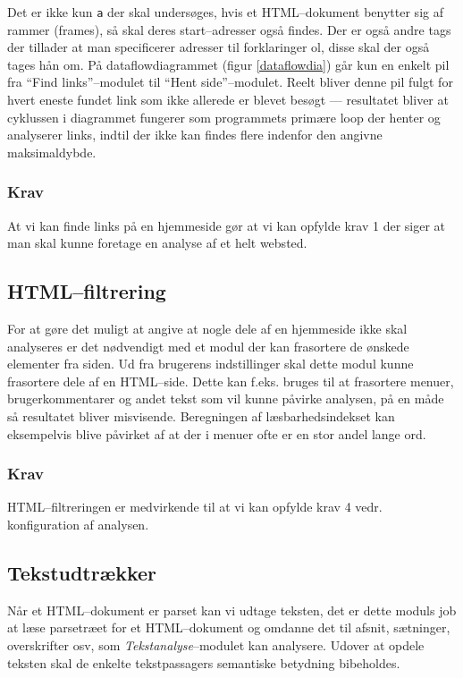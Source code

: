 \documentclass[a4paper,oneside]{memoir}
\begin{document}
Det er ikke kun \texttt{a} der skal undersøges, hvis et HTML--dokument
benytter sig af rammer (frames), så skal deres start--adresser også
findes. Der er også andre tags der tillader at man specificerer
adresser til forklaringer ol, disse skal der også tages hån om.
\label{cyklus}
  På dataflowdiagrammet (figur \ref{dataflowdia}) går kun en enkelt pil fra
``Find links''--modulet til ``Hent side''--modulet. Reelt bliver denne pil fulgt
for hvert eneste
fundet link som ikke allerede er blevet besøgt --- resultatet bliver at
cyklussen i diagrammet fungerer som programmets primære loop der
henter og analyserer links, indtil der ikke kan findes flere indenfor
den angivne maksimaldybde.

\subsubsection{Krav}
At vi kan finde links på en hjemmeside gør at vi kan opfylde krav 1
der siger at man skal kunne foretage en analyse af et helt websted.

\subsection{HTML--filtrering}
For at gøre det muligt at angive at nogle dele af en hjemmeside ikke
skal analyseres er det nødvendigt med et modul der kan frasortere de
ønskede elementer fra siden. Ud fra brugerens indstillinger skal dette
modul kunne frasortere dele af en HTML--side. Dette kan f.eks. bruges
til at frasortere menuer, brugerkommentarer og andet tekst som vil
kunne påvirke analysen, på en måde så resultatet bliver
misvisende. Beregningen af læsbarhedsindekset kan eksempelvis blive
påvirket af at der i menuer ofte er en stor andel lange ord.

\subsubsection{Krav}
HTML--filtreringen er medvirkende til at vi kan opfylde krav 4
vedr. konfiguration af analysen.

\subsection{Tekstudtrækker}
\label{tekstudtraekkerdesign}
Når et HTML--dokument er parset kan vi udtage teksten, det er dette
moduls job at læse parsetræet for et HTML--dokument og omdanne det til
afsnit, sætninger, overskrifter osv, som \textit{Tekstanalyse}--modulet
kan analysere. Udover at opdele teksten skal de enkelte tekstpassagers
semantiske betydning bibeholdes.
\end{document}
